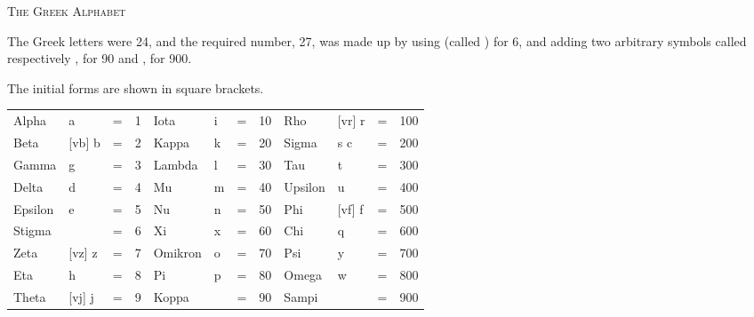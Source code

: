 \thispagestyle{empty}
\def\tg#1{\textgreek{#1}}
\begin{center}
\LARGE\scshape The Greek Alphabet
\end{center}

The Greek letters were 24, and the required number, 27, was made
up by using \tg{\stigma} (called ) for 6,
and adding two arbitrary symbols called respectively ,
for 90 and , for 900.

The initial forms are shown in square brackets.

{
\hspace*{-0.4in}
\begin{tabular}{llllllllllll}
Alpha   & \tg{a}       & = & 1 & Iota    & \tg{i}      & = & 10      & Rho     & \tg{[vr] r} & = & 100\\
Beta    & \tg{[vb] b}  & = & 2 & Kappa   & \tg{k}      & = & 20      & Sigma   & \tg{s c}    & = & 200\\
Gamma   & \tg{g}       & = & 3 & Lambda  & \tg{l}      & = & 30      & Tau     & \tg{t}      & = & 300\\
Delta   & \tg{d}       & = & 4 & Mu      & \tg{m}      & = & 40      & Upsilon & \tg{u}      & = & 400\\
Epsilon & \tg{e}       & = & 5 & Nu      & \tg{n}      & = & 50      & Phi     & \tg{[vf] f} & = & 500\\
Stigma  & \tg{\stigma} & = & 6 & Xi      & \tg{x}      & = & 60      & Chi     & \tg{q}      & = & 600\\
Zeta    & \tg{[vz] z}  & = & 7 & Omikron & \tg{o}      & = & 70      & Psi     & \tg{y}      & = & 700\\
Eta     & \tg{h}       & = & 8 & Pi      & \tg{p}      & = & 80      & Omega   & \tg{w}      & = & 800\\
Theta   & \tg{[vj] j}  & = & 9 & Koppa   & \tg{\qoppa} & = & 90      & Sampi   & \tg{\sampi} & = & 900
\end{tabular}
}
